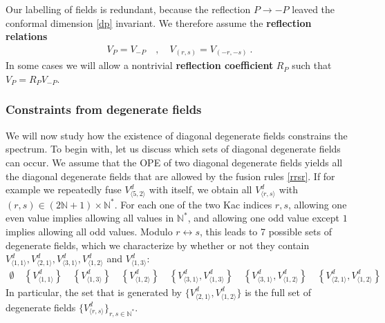 \documentclass[12pt, a4paper]{article}
\newcommand{\myindex}[1]{\textbf{\boldmath #1}}
\theoremstyle{break}
\begin{document}
Our labelling of fields is redundant, because the reflection $P\to -P$ leaved the conformal dimension \eqref{dp} invariant. We therefore assume the \myindex{reflection relations}
\begin{align}
 V_{P} = V_{-P} \quad , \quad V_{(r,s)} = V_{(-r,-s)} \ . 
 \label{refl}
\end{align}
In some cases we will allow a nontrivial \myindex{reflection coefficient} $R_P$ such that $V_P=R_P V_{-P}$. 


\subsubsection{Constraints from degenerate fields}\label{sec:dotc}

We will now study how the existence of diagonal degenerate fields constrains the spectrum. To begin with, let us discuss which sets of diagonal degenerate fields can occur.
We assume that the OPE of two diagonal degenerate fields yields all the diagonal degenerate fields that are allowed by the fusion rules \eqref{rrsr}. 
If for example we repeatedly fuse $V^d_{\langle 5,2\rangle}$ with itself, we obtain all $V^d_{\langle r,s\rangle}$ with $(r,s)\in (2\mathbb{N}+1)\times \mathbb{N}^*$. For each one of the two Kac indices $r,s$, allowing one even value implies allowing all values in $\mathbb{N}^*$, and allowing one odd value except $1$ implies allowing all odd values. Modulo $r\leftrightarrow s$, this leads to 7 possible sets of degenerate fields, which we characterize by whether or not they contain $V^d_{\langle 1,1\rangle}, V^d_{\langle 2,1\rangle},V^d_{\langle 3,1\rangle},V^d_{\langle 1,2\rangle}$ and $V^d_{\langle 1,3\rangle}$:
\begin{align}
  \emptyset \quad \left\{V^d_{\langle 1,1\rangle}\right\}  \quad \left\{V^d_{\langle 1,3\rangle}\right\} \quad \left\{V^d_{\langle 1,2\rangle}\right\} 
  \quad 
  \left\{V^d_{\langle 3,1\rangle},V^d_{\langle 1,3\rangle}\right\} \quad 
  \left\{V^d_{\langle 3,1\rangle},V^d_{\langle 1,2\rangle}\right\} \quad 
  \left\{V^d_{\langle 2,1\rangle},V^d_{\langle 1,2\rangle}\right\} 
 \label{degsets}
\end{align}
In particular, the set that is generated by $\{V^d_{\langle 2,1\rangle},V^d_{\langle 1,2\rangle}\} $ is the full set of degenerate fields $\{V^d_{\langle r,s\rangle}\}_{r,s\in\mathbb{N}^*}$. 
\end{document}

